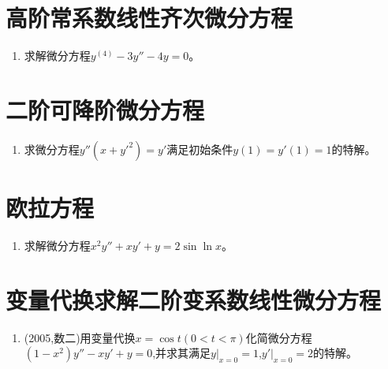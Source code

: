 \documentclass[12pt, a4paper, oneside, UTF8]{ctexbook}
\begin{document}
\section{ 高阶常系数线性齐次微分方程}

\begin{enumerate}[label=\arabic*.,start=12]
    \item 求解微分方程$y^{(4)}-3y''-4y=0$。
    
    \begin{solution}
    \newpage
    \end{solution}
\end{enumerate}

\section{ 二阶可降阶微分方程}
\begin{enumerate}[label=\arabic*.,start=13]
    \item 求微分方程$y''(x+y'^2)=y'$满足初始条件$y(1)=y'(1)=1$的特解。
    
    \begin{solution}
    
    \end{solution}
\end{enumerate}

\section{ 欧拉方程}

\begin{enumerate}[label=\arabic*.,start=14]
    \item 求解微分方程$x^2y''+xy'+y=2\sin\ln x$。
    
    \begin{solution}
    \newpage
    \end{solution}
\end{enumerate}

\section{ 变量代换求解二阶变系数线性微分方程}

\begin{enumerate}[label=\arabic*.,start=17]
    \item (2005,数二)用变量代换$x=\cos t(0<t<\pi)$化简微分方程$(1-x^2)y''-xy'+y=0$,并求其满足$y|_{x=0}=1$,$y'|_{x=0}=2$的特解。
    
    \begin{solution}
    \newpage
    \end{solution}
\end{enumerate}
\end{document}
